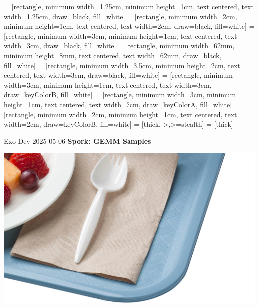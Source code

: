 



 = [rectangle, minimum width=1.25cm, minimum height=1cm, text centered, text width=1.25cm, draw=black, fill=white]
 = [rectangle, minimum width=2cm, minimum height=1cm, text centered, text width=2cm, draw=black, fill=white]
 = [rectangle, minimum width=3cm, minimum height=1cm, text centered, text width=3cm, draw=black, fill=white]
 = [rectangle, minimum width=62mm, minimum height=8mm, text centered, text width=62mm, draw=black, fill=white]
 = [rectangle, minimum width=3.5cm, minimum height=2cm, text centered, text width=3cm, draw=black, fill=white]
 = [rectangle, minimum width=3cm, minimum height=1cm, text centered, text width=3cm, draw=keyColorB, fill=white]
 = [rectangle, minimum width=3cm, minimum height=1cm, text centered, text width=3cm, draw=keyColorA, fill=white]
 = [rectangle, minimum width=2cm, minimum height=1cm, text centered, text width=2cm, draw=keyColorB, fill=white]
 = [thick,->,>=stealth]
 = [thick]

{ \LARGE Exo Dev 2025-05-06 } \hfill { \LARGE \textbf{\textsf{Spork: GEMM Samples}}}

\includegraphics[width=\linewidth]{usda_spork.jpg}

\newpage
{}


\newpage
{}



\newpage
{}



